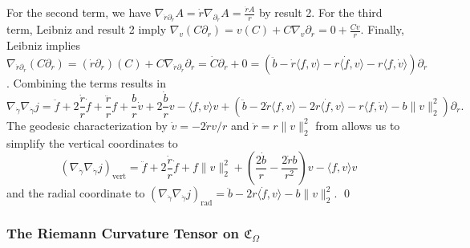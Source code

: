 \documentclass[11pt]{article}
\begin{document}
For the second term, we have $\nabla_{\dot r\partial_r}A = \dot r\nabla_{\partial_r}A = \frac{\dot rA}{r}$ by result 2. For the third term, Leibniz and result 2 imply $\nabla_v(C\partial_r) = v(C) + C\nabla_v\partial_r = 0 + \frac{Cv}{r}$. Finally, Leibniz implies $\nabla_{\dot r\partial_r}(C\partial_r) = (\dot r\partial_r)(C) + C\nabla_{\dot r\partial_r}\partial_r = \dot C \partial_r + 0 = (\ddot b - \dot r\langle f, v\rangle - r\langle \dot f, v\rangle - r \langle f, \dot v\rangle)\partial_r$. Combining the terms results in
\[\nabla_{\dot \gamma}\nabla_{\dot \gamma}j =  \ddot f + 2\frac{\dot r}{r}\dot f + \frac{\ddot r}{r}f+ \frac{b}{r}\dot v + 2\frac{\dot b}{r}v - \langle f,v\rangle v  + \left(\ddot b - 2\dot r \langle f, v\rangle -2r\langle \dot f, v\rangle - r\langle f, \dot v\rangle - b\|v\|_2^2\right)\partial_r.\]
The geodesic characterization by $\dot v = -2\dot rv/r$ and $\ddot r = r\|v\|_2^2$ from  allows us to simplify the vertical coordinates to
\[(\nabla_{\dot \gamma}\nabla_{\dot \gamma}j)_{\text{vert}} = \ddot f + 2\frac{\dot r}{r}\dot f + f\|v\|_2^2  + \left(\frac{2\dot b}{r} - \frac{2 \dot rb}{r^2}\right)v - \langle f,v\rangle v\]
and the radial coordinate to $(\nabla_{\dot \gamma}\nabla_{\dot \gamma}j)_{\text{rad}} = \ddot b - 2r\langle \dot f, v\rangle - b\|v\|_2^2.$
\qed{}


\subsubsection{The Riemann Curvature Tensor on $\mathfrak{C}_\Omega$}
\end{document}
